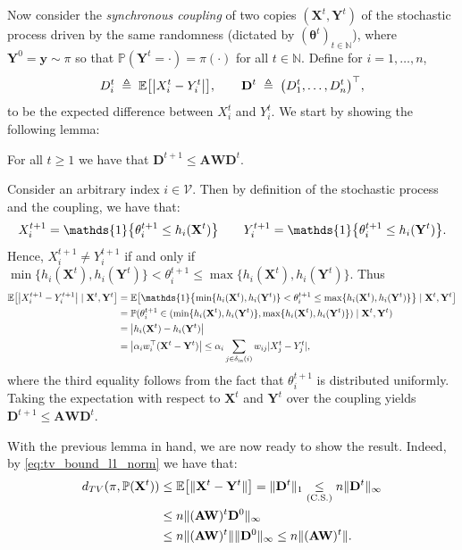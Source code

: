 \documentclass[mnsc,nonblindrev]{informs3}
\newcommand{\NN}{\mathbb{N}}
\newcommand{\Ind}[1]{\mathds{1}\left\{ #1 \right\}}
\newcommand{\Exp}[1]{\mathbb E \left[ #1 \right]} %
\renewcommand{\Pr}{\mathbb{P}}
\newcommand{\din}{\delta_{\text{in}}}
\newcommand{\Xvec}{\mathbf{X}}
\newcommand{\thetavec}{\mathbf{\theta}}
\newcommand{\Dvec}{\mathbf{D}}
\newcommand{\Yvec}{\mathbf{Y}}
\newcommand{\yvec}{\mathbf{y}}
\newcommand{\A}{\mathbf{A}}
\newcommand{\W}{\mathbf{W}}
\newcommand{\abs}[1]{\left\lvert #1 \right\rvert}
\DeclarePairedDelimiter{\norm}{\lVert}{\rVert}
\let\originalleft\left
\let\originalright\right
\renewcommand{\left}{\mathopen{}\mathclose\bgroup\originalleft}
\renewcommand{\right}{\aftergroup\egroup\originalright}
\renewenvironment{proof}[1][Proof]{%
  \par\noindent{\itshape #1.} \ignorespaces
}{%
  \hfill\Halmos\par
}
\begin{document}
\begin{proof}
Now consider the \emph{synchronous coupling} of two copies $(\Xvec^{t},\Yvec^{t})$ of the stochastic process driven by the same randomness (dictated by $(\thetavec^t)_{t \in \NN}$), where $\Yvec^{0} = \yvec \sim\pi$ so that $\Pr(\Yvec^{t} = \cdot)=\pi(\cdot)$ for all $t \in \NN$.
Define for $i=1,\ldots,n$,
\[
D_i^{t} \;\triangleq\; \Exp{\abs{X_i^t - Y_i^t}},
\qquad
\Dvec^{t} \; \triangleq \; \bigl(D_1^{t},\ldots,D_n^{t}\bigr)^{\top},
\]
to be the expected difference between $X_i^t$ and $Y_i^t$.  
%
We start by showing the following lemma:
\begin{lemma}
\label{lem:one_step_expected_difference}
For all $t \geq 1$ we have that
\(
\Dvec^{t+1} \leq \A\W\Dvec^t.
\)
\end{lemma}
\begin{proof}
Consider an arbitrary index $i \in \mathcal{V}$.  Then by definition of the stochastic process and the coupling, we have that:
\[
X_i^{t+1} = \Ind{\theta_i^{t+1} \leq h_i(\Xvec^t)} \quad\quad Y_i^{t+1} = \Ind{\theta_i^{t+1} \leq h_i(\Yvec^t)}.
\]
Hence, $X_i^{t+1} \neq Y_i^{t+1}$ if and only if $\min\{h_i(\Xvec^t), h_i(\Yvec^t)\} < \theta_i^{t+1} \leq \max\{h_i(\Xvec^t), h_i(\Yvec^t)\}$.  Thus
\begin{align*}
    \Exp{\abs{X_i^{t+1} - Y_i^{t+1}} \mid \Xvec^t, \Yvec^t} & = \Exp{\Ind{\min\{h_i(\Xvec^t), h_i(\Yvec^t)\} < \theta_i^{t+1} \leq \max\{h_i(\Xvec^t), h_i(\Yvec^t)\}} \mid \Xvec^t, \Yvec^t} \\
    & = \Pr(\theta_i^{t+1} \in (\min\{h_i(\Xvec^t), h_i(\Yvec^t)\}, \max\{h_i(\Xvec^t), h_i(\Yvec^t)\}) \mid \Xvec^t, \Yvec^t) \\
    & = \abs{h_i(\Xvec^t) - h_i(\Yvec^t)} \\
    & = \abs{\alpha_i w_i^\top(\Xvec^t - \Yvec^t)} \leq \alpha_i \sum_{j \in \din(i)} w_{ij} |X_j^t - Y_j^t|,
\end{align*}
where the third equality follows from the fact that $\theta_i^{t+1}$ is distributed uniformly. Taking the expectation with respect to $\Xvec^t$ and $\Yvec^t$ over the coupling yields $\Dvec^{t+1} \leq \A\W\Dvec^t$.
\end{proof}

With the previous lemma in hand, we are now ready to show the result.  Indeed, by \cref{eq:tv_bound_l1_norm} we have that:
\begin{align*}
    d_{TV}(\pi, \Pr(\Xvec^t)) & \leq \Exp{\norm{\Xvec^t - \Yvec^t}} = \norm{\Dvec^t}_1 \underset{(\text{C.S.})}{\leq}n \norm{\Dvec^t}_\infty\\
    & \leq n \norm{(\A\W)^t \Dvec^0}_\infty \\
    & \leq n \norm{(\A\W)^t} \norm{\Dvec^0}_{\infty} \leq n \norm{(\A\W)^t}.
\end{align*}


\end{proof}
\end{document}
